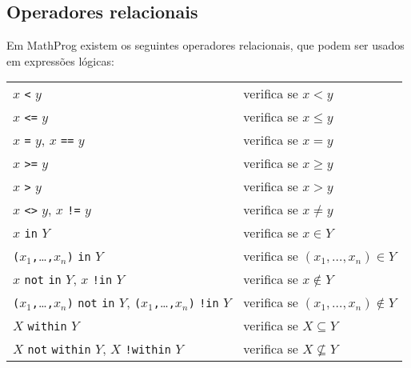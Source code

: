 \documentclass[11pt, brazil]{report}
\begin{document}
\vspace*{-8pt}

\subsection{Operadores relacionais}

Em MathProg existem os seguintes operadores relacionais, que podem
ser usados em expressões lógicas:


\begin{tabular}{@{}ll@{}}
$x$ {\tt<} $y$&verifica se $x<y$\\
$x$ {\tt<=} $y$&verifica se $x\leq y$\\
$x$ {\tt=} $y$, $x$ {\tt==} $y$&verifica se $x=y$\\
$x$ {\tt>=} $y$&verifica se $x\geq y$\\
$x$ {\tt>} $y$&verifica se $x>y$\\
$x$ {\tt<>} $y$, $x$ {\tt!=} $y$&verifica se $x\neq y$\\
$x$ {\tt in} $Y$&verifica se $x\in Y$\\
{\tt(}$x_1${\tt,}\dots{\tt,}$x_n${\tt)} {\tt in} $Y$&verifica se
$(x_1,\dots,x_n)\in Y$\\
$x$ {\tt not} {\tt in} $Y$, $x$ {\tt!in} $Y$&verifica se $x\not\in Y$\\
{\tt(}$x_1${\tt,}\dots{\tt,}$x_n${\tt)} {\tt not} {\tt in} $Y$,
{\tt(}$x_1${\tt,}\dots{\tt,}$x_n${\tt)} {\tt !in} $Y$&verifica se
$(x_1,\dots,x_n)\not\in Y$\\
$X$ {\tt within} $Y$&verifica se $X\subseteq Y$\\
$X$ {\tt not} {\tt within} $Y$, $X$ {\tt !within} $Y$&verifica se
$X\not\subseteq Y$\\
\end{tabular}
\end{document}
